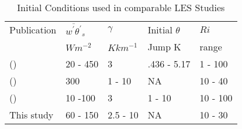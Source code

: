\begin{table}[htbp]
\caption[Initial Conditions used in comparable LES Studies]{Initial Conditions used in comparable LES Studies                    }

    \begin{tabular}{ p{4cm} p{1.4cm} p{1.4cm} p{1.7cm} p{1.8cm}}
Publication & $\overline{w^{'}\theta^{'}}_{s}$& $\gamma$& Initial $\theta$ & $Ri$ \\ 
& $Wm^{-2}$ & $Kkm^{-1}$ & Jump K & range \\ \hline
      \citeauthor{SullMoengStev} (\citeyear{SullMoengStev}) & 20 - 450& 3  &.436 - 5.17 & 1 - 100\\ %
      \citeauthor{FedConzMir04} (\citeyear{FedConzMir04}) & 300 & 1 - 10 & NA & 10 - 40\\ %
      \citeauthor{BrooksFowler2} (\citeyear{BrooksFowler2}) &  10 -100 &  3& 1 - 10 &10 - 100 \\ %
      This study & 60 - 150 & 2.5 - 10& NA & 10 - 30\\ \hline 
      
    \end{tabular}
\label{table:initconditcomp}   
\end{table}


